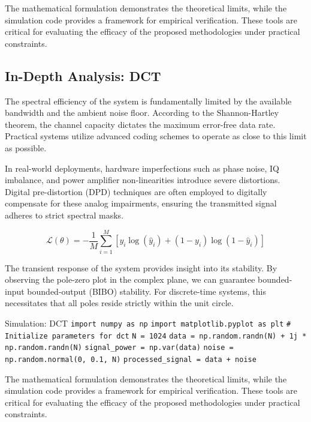 \vspace{0.5cm}
The mathematical formulation demonstrates the theoretical limits, while the simulation code provides a framework for empirical verification. These tools are critical for evaluating the efficacy of the proposed methodologies under practical constraints.


\subsection{In-Depth Analysis: DCT}
The spectral efficiency of the system is fundamentally limited by the available bandwidth and the ambient noise floor. According to the Shannon-Hartley theorem, the channel capacity dictates the maximum error-free data rate. Practical systems utilize advanced coding schemes to operate as close to this limit as possible.

In real-world deployments, hardware imperfections such as phase noise, IQ imbalance, and power amplifier non-linearities introduce severe distortions. Digital pre-distortion (DPD) techniques are often employed to digitally compensate for these analog impairments, ensuring the transmitted signal adheres to strict spectral masks.

\begin{equation}
    \mathcal{L}(\theta) = -\frac{1}{M} \sum_{i=1}^{M} \left[ y_i \log(\hat{y}_i) + (1-y_i)\log(1-\hat{y}_i) \right]
\end{equation}

The transient response of the system provides insight into its stability. By observing the pole-zero plot in the complex plane, we can guarantee bounded-input bounded-output (BIBO) stability. For discrete-time systems, this necessitates that all poles reside strictly within the unit circle.

\begin{pythonbox}{Simulation: DCT}
\texttt{import numpy as np}
\texttt{import matplotlib.pyplot as plt}
\texttt{}
\texttt{\# Initialize parameters for dct}
\texttt{N = 1024}
\texttt{data = np.random.randn(N) + 1j * np.random.randn(N)}
\texttt{signal\_power = np.var(data)}
\texttt{noise = np.random.normal(0, 0.1, N)}
\texttt{processed\_signal = data + noise}
\end{pythonbox}

\vspace{0.5cm}
The mathematical formulation demonstrates the theoretical limits, while the simulation code provides a framework for empirical verification. These tools are critical for evaluating the efficacy of the proposed methodologies under practical constraints.

